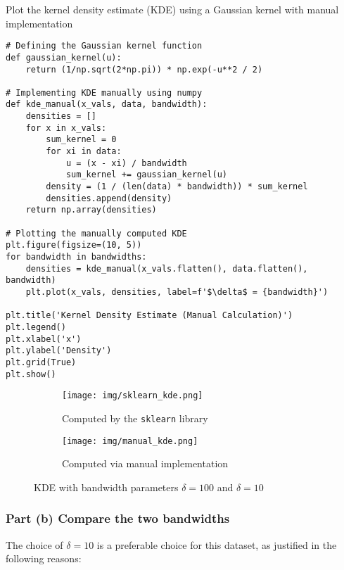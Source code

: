 \documentclass{article}
\begin{document}
\begin{listing}[H]
\caption{Plot the kernel density estimate (KDE) using a Gaussian kernel with manual implementation}
\label{code:kde_manual}
\begin{verbatim}
# Defining the Gaussian kernel function
def gaussian_kernel(u):
    return (1/np.sqrt(2*np.pi)) * np.exp(-u**2 / 2)

# Implementing KDE manually using numpy
def kde_manual(x_vals, data, bandwidth):
    densities = []
    for x in x_vals:
        sum_kernel = 0
        for xi in data:
            u = (x - xi) / bandwidth
            sum_kernel += gaussian_kernel(u)
        density = (1 / (len(data) * bandwidth)) * sum_kernel
        densities.append(density)
    return np.array(densities)

# Plotting the manually computed KDE
plt.figure(figsize=(10, 5))
for bandwidth in bandwidths:
    densities = kde_manual(x_vals.flatten(), data.flatten(), bandwidth)
    plt.plot(x_vals, densities, label=f'$\delta$ = {bandwidth}')

plt.title('Kernel Density Estimate (Manual Calculation)')
plt.legend()
plt.xlabel('x')
plt.ylabel('Density')
plt.grid(True)
plt.show()
\end{verbatim}
\end{listing}

\begin{figure}[!htbp]
    \centering
    \begin{subfigure}{0.5\textwidth}
        \centering
        \texttt{[image: img/sklearn\_kde.png]}
        \caption{Computed by the \texttt{sklearn} library}
        \label{fig:subfig1}
    \end{subfigure}%
    \begin{subfigure}{0.5\textwidth}
        \centering
        \texttt{[image: img/manual\_kde.png]}
        \caption{Computed via manual implementation}
        \label{fig:subfig2}
    \end{subfigure}
    \caption{KDE with bandwidth parameters \( \delta = 100 \) and \( \delta = 10 \)}
    \label{fig:kde_plot}
\end{figure}

\subsubsection*{Part (b) Compare the two bandwidths}

The choice of $\delta = 10$ is a preferable choice for this dataset, as justified in the following reasons:
\end{document}

